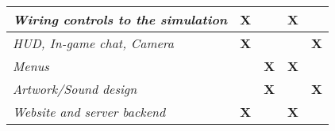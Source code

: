 \begin{landscape}
\begin{table}[]
\begin{tabular}{|lcccc|}
\multicolumn{1}{|l|}{\textit{Wiring controls to the simulation}}                                                  & \textbf{X}                                    & \textbf{}                                   & \textbf{X}                                      & \textbf{}                                    \\ \hline
\multicolumn{1}{|l|}{\textit{HUD, In-game chat, Camera}}                                                          & \textbf{X}                                    & \textbf{}                                   & \textbf{}                                       & \textbf{X}                                   \\ \hline
\multicolumn{1}{|l|}{\textit{Menus}}                                                                              & \textbf{}                                     & \textbf{X}                                  & \textbf{X}                                      & \textbf{}                                    \\ \hline
\multicolumn{1}{|l|}{\textit{Artwork/Sound design}}                                                               & \textbf{}                                     & \textbf{X}                                  & \textbf{}                                       & \textbf{X}                                   \\ \hline
\multicolumn{1}{|l|}{\textit{Website and server backend}}                                                         & \textbf{X}                                    & \textbf{}                                   & \textbf{X}                                      & \textbf{}                                    \\ \hline
\end{tabular}
\end{table}


\end{landscape}
